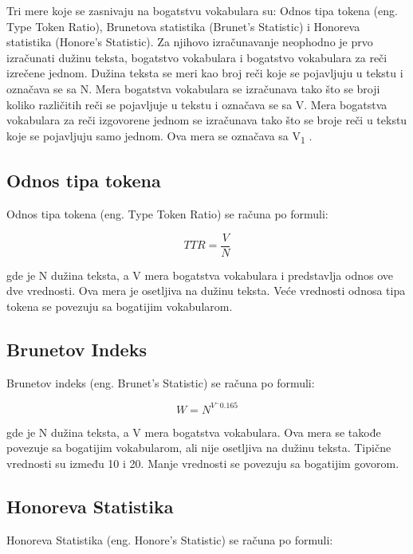 \documentclass[12pt,oneside]{memoir}
\begin{document}
Tri mere koje se zasnivaju na bogatstvu vokabulara su: Odnos tipa tokena (eng. Type Token Ratio),  Brunetova statistika (Brunet's Statistic) i Honoreva statistika (Honore's Statistic).  Za njihovo izračunavanje neophodno je prvo izračunati dužinu teksta, bogatstvo vokabulara i bogatstvo vokabulara za reči izrečene jednom.  Dužina teksta se meri kao broj reči koje se pojavljuju u tekstu i označava se sa N.  Mera bogatstva vokabulara se izračunava tako što se broji koliko različitih reči se pojavljuje u tekstu i označava se sa V. Mera bogatstva vokabulara za reči izgovorene jednom se izračunava tako što se broje reči u tekstu koje se pojavljuju samo jednom.  Ova mera se označava sa V\textsubscript{1} .  

\subsection{Odnos tipa tokena}

Odnos tipa tokena (eng. Type Token Ratio) se računa po formuli:

\begin{equation}
	TTR = \frac{V}{N}
\end{equation}

gde je N dužina teksta, a V mera bogatstva vokabulara i predstavlja odnos ove dve vrednosti. Ova mera je osetljiva na dužinu teksta.  Veće vrednosti odnosa tipa tokena se povezuju sa bogatijim vokabularom. 

\subsection{Brunetov Indeks}

Brunetov indeks (eng. Brunet's Statistic) se računa po formuli:

\begin{equation}
	W = N^{V^-0.165}
\end{equation}

gde je N dužina teksta, a V mera bogatstva vokabulara. Ova mera se takođe povezuje sa bogatijim vokabularom, ali nije osetljiva na dužinu teksta.  Tipične vrednosti su između 10 i 20.  Manje vrednosti se povezuju sa bogatijim govorom. 

\subsection{Honoreva Statistika}

Honoreva Statistika (eng. Honore's Statistic) se računa po formuli:
\end{document}
